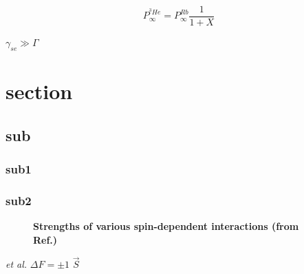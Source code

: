 \documentclass[pdftex,letterpaper,12pt]{report}
\begin{document}
	
\begin{equation}
P_{\infty}^{^{3}He}=P_{\infty}^{Rb}\frac{1}{1+X}
\end{equation}

$\gamma_{se} \gg \Gamma$

\section{section}
\subsection{sub}
\subsubsection{sub1}
\subsubsection{sub2}

\begin{figure}[H]
	\centering
	\caption{{\bf Strengths of various spin-dependent interactions (from Ref.\@ \cite{WalkerHapper})}}
	\label{SpinExchange}
\end{figure}

\emph{et al.}
$\Delta F=\pm1$
$\vec{S}$


\end{document}
